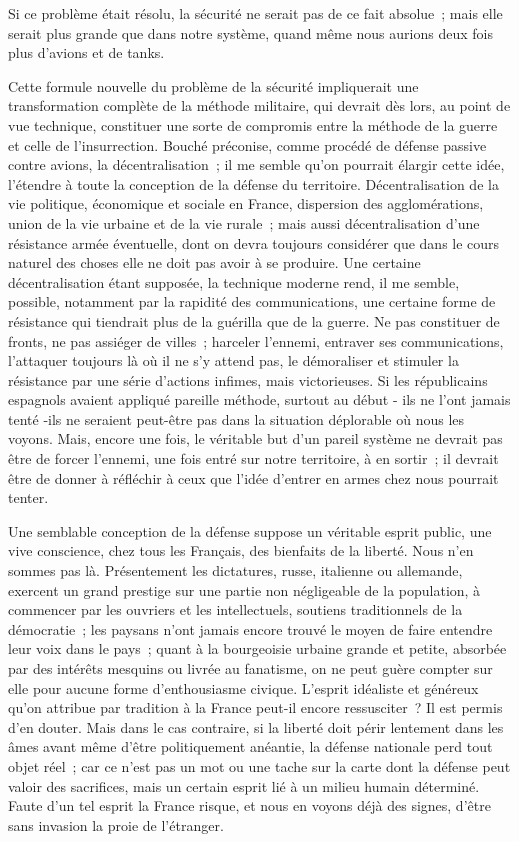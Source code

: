\documentclass[french,twoside]{book} %
\begin{document}
Si ce problème était résolu, la sécurité ne serait pas de ce fait absolue ; mais elle serait plus grande que dans notre système, quand même nous aurions deux fois plus d'avions et de tanks.\par
Cette formule nouvelle du problème de la sécurité impliquerait une transformation complète de la méthode militaire, qui devrait dès lors, au point de vue technique, constituer une sorte de compromis entre la méthode de la guerre et celle de l'insurrection. Bouché préconise, comme procédé de défense passive contre avions, la décentralisation ; il me semble qu'on pourrait élargir cette idée, l'étendre à toute la conception de la défense du territoire. Décentra­lisation de la vie politique, économique et sociale en France, dispersion des agglomérations, union de la vie urbaine et de la vie rurale ; mais aussi décentralisation d'une résistance armée éventuelle, dont on devra toujours considérer que dans le cours naturel des choses elle ne doit pas avoir à se produire. Une certaine décentralisation étant supposée, la technique moderne rend, il me semble, possible, notamment par la rapidité des communications, une certaine forme de résistance qui tiendrait plus de la guérilla que de la guerre. Ne pas constituer de fronts, ne pas assiéger de villes ; harceler l'ennemi, entraver ses communications, l'attaquer toujours là où il ne s'y attend pas, le démoraliser et stimuler la résistance par une série d'actions infimes, mais victorieuses. Si les républicains espagnols avaient appliqué pareille méthode, surtout au début - ils ne l'ont jamais tenté -ils ne seraient peut-être pas dans la situation déplorable où nous les voyons. Mais, encore une fois, le véritable but d'un pareil système ne devrait pas être de forcer l'ennemi, une fois entré sur notre territoire, à en sortir ; il devrait être de donner à réfléchir à ceux que l'idée d'entrer en armes chez nous pourrait tenter.\par
Une semblable conception de la défense suppose un véritable esprit public, une vive conscience, chez tous les Français, des bienfaits de la liberté. Nous n'en sommes pas là. Présentement les dictatures, russe, italienne ou allemande, exercent un grand prestige sur une partie non négligeable de la population, à commencer par les ouvriers et les intellectuels, soutiens tradi­tionnels de la démocratie ; les paysans n'ont jamais encore trouvé le moyen de faire entendre leur voix dans le pays ; quant à la bourgeoisie urbaine grande et petite, absorbée par des intérêts mesquins ou livrée au fanatisme, on ne peut guère compter sur elle pour aucune forme d'enthousiasme civique. L'esprit idéaliste et généreux qu'on attribue par tradition à la France peut-il encore ressusciter ? Il est permis d'en douter. Mais dans le cas contraire, si la liberté doit périr lentement dans les âmes avant même d'être politiquement anéantie, la défense nationale perd tout objet réel ; car ce n'est pas un mot ou une tache sur la carte dont la défense peut valoir des sacrifices, mais un certain esprit lié à un milieu humain déterminé. Faute d'un tel esprit la France risque, et nous en voyons déjà des signes, d'être sans invasion la proie de l'étranger.\par
\end{document}
